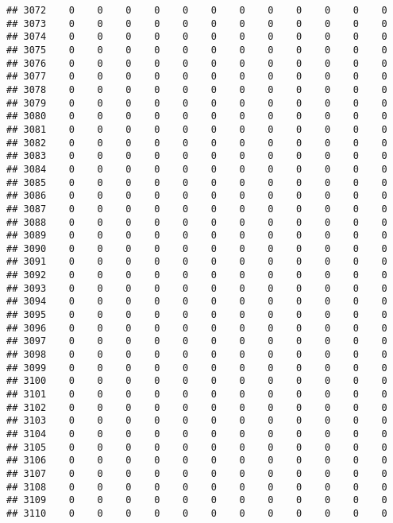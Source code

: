 \documentclass[]{article}
\begin{document}
\begin{verbatim}
## 3072    0    0    0    0    0    0    0    0    0    0    0    0
## 3073    0    0    0    0    0    0    0    0    0    0    0    0
## 3074    0    0    0    0    0    0    0    0    0    0    0    0
## 3075    0    0    0    0    0    0    0    0    0    0    0    0
## 3076    0    0    0    0    0    0    0    0    0    0    0    0
## 3077    0    0    0    0    0    0    0    0    0    0    0    0
## 3078    0    0    0    0    0    0    0    0    0    0    0    0
## 3079    0    0    0    0    0    0    0    0    0    0    0    0
## 3080    0    0    0    0    0    0    0    0    0    0    0    0
## 3081    0    0    0    0    0    0    0    0    0    0    0    0
## 3082    0    0    0    0    0    0    0    0    0    0    0    0
## 3083    0    0    0    0    0    0    0    0    0    0    0    0
## 3084    0    0    0    0    0    0    0    0    0    0    0    0
## 3085    0    0    0    0    0    0    0    0    0    0    0    0
## 3086    0    0    0    0    0    0    0    0    0    0    0    0
## 3087    0    0    0    0    0    0    0    0    0    0    0    0
## 3088    0    0    0    0    0    0    0    0    0    0    0    0
## 3089    0    0    0    0    0    0    0    0    0    0    0    0
## 3090    0    0    0    0    0    0    0    0    0    0    0    0
## 3091    0    0    0    0    0    0    0    0    0    0    0    0
## 3092    0    0    0    0    0    0    0    0    0    0    0    0
## 3093    0    0    0    0    0    0    0    0    0    0    0    0
## 3094    0    0    0    0    0    0    0    0    0    0    0    0
## 3095    0    0    0    0    0    0    0    0    0    0    0    0
## 3096    0    0    0    0    0    0    0    0    0    0    0    0
## 3097    0    0    0    0    0    0    0    0    0    0    0    0
## 3098    0    0    0    0    0    0    0    0    0    0    0    0
## 3099    0    0    0    0    0    0    0    0    0    0    0    0
## 3100    0    0    0    0    0    0    0    0    0    0    0    0
## 3101    0    0    0    0    0    0    0    0    0    0    0    0
## 3102    0    0    0    0    0    0    0    0    0    0    0    0
## 3103    0    0    0    0    0    0    0    0    0    0    0    0
## 3104    0    0    0    0    0    0    0    0    0    0    0    0
## 3105    0    0    0    0    0    0    0    0    0    0    0    0
## 3106    0    0    0    0    0    0    0    0    0    0    0    0
## 3107    0    0    0    0    0    0    0    0    0    0    0    0
## 3108    0    0    0    0    0    0    0    0    0    0    0    0
## 3109    0    0    0    0    0    0    0    0    0    0    0    0
## 3110    0    0    0    0    0    0    0    0    0    0    0    0

\end{verbatim}
\end{document}

